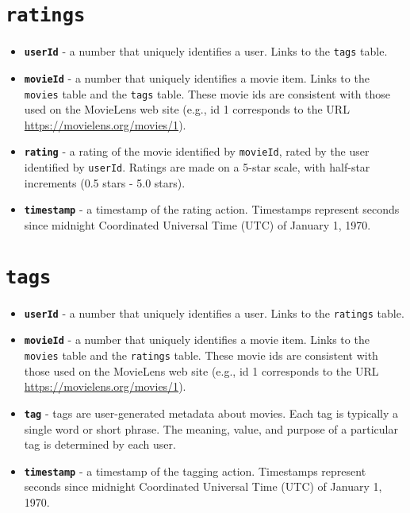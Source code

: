 \section{\texttt{ratings}}\label{appendix:sec:ratings}
\begin{itemize}
    \item \textbf{\texttt{userId}} - a number that uniquely identifies a user. Links to the \texttt{tags} table.
    \item \textbf{\texttt{movieId}} - a number that uniquely identifies a movie item. Links to the \texttt{movies} table and the \texttt{tags} table. These movie ids are consistent with those used on the MovieLens web site (e.g., id 1 corresponds to the URL \url{https://movielens.org/movies/1}).
    \item \textbf{\texttt{rating}} - a rating of the movie identified by \texttt{movieId}, rated by the user identified by \texttt{userId}. Ratings are made on a 5-star scale, with half-star increments (0.5 stars - 5.0 stars).
    \item \textbf{\texttt{timestamp}} - a timestamp of the rating action. Timestamps represent seconds since midnight Coordinated Universal Time (UTC) of January 1, 1970.
\end{itemize}
% 

\section{\texttt{tags}}\label{appendix:sec:tags}
\begin{itemize}
    \item \textbf{\texttt{userId}} - a number that uniquely identifies a user. Links to the \texttt{ratings} table.
    \item \textbf{\texttt{movieId}} - a number that uniquely identifies a movie item. Links to the \texttt{movies} table and the \texttt{ratings} table. These movie ids are consistent with those used on the MovieLens web site (e.g., id 1 corresponds to the URL \url{https://movielens.org/movies/1}).
    \item \textbf{\texttt{tag}} - tags are user-generated metadata about movies. Each tag is typically a single word or short phrase. The meaning, value, and purpose of a particular tag is determined by each user.
    \item \textbf{\texttt{timestamp}} - a timestamp of the tagging action. Timestamps represent seconds since midnight Coordinated Universal Time (UTC) of January 1, 1970.
\end{itemize}
